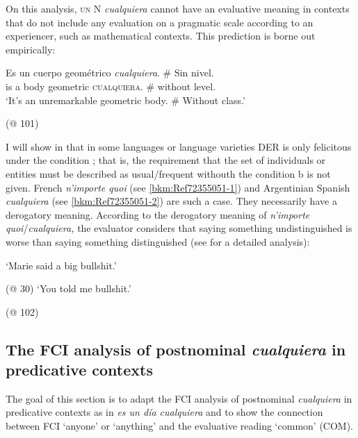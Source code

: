 {On this analysis, \textsc{un} N \textit{cualquiera} cannot have an evaluative meaning in contexts that do not include any evaluation on a pragmatic scale according to an experiencer, such as mathematical contexts. This prediction is borne out empirically:

\ea \label{ex:key:167} %
  \gll Es un cuerpo geométrico \textit{cualquiera}. \# Sin nivel.\\
is a body geometric \textsc{cualquiera}. \# without level.\\
  \glt  ‘It’s an unremarkable geometric body. \# Without class.’

  (@ 101)
\z

I will show in  that in some languages or language varieties DER is only felicitous under the condition ; that is, the requirement that the set of individuals or entities must be described as usual/frequent withouth the condition b is not given. French \textit{n’importe quoi} (see \ref{bkm:Ref72355051-1}) and Argentinian Spanish \textit{cualquiera} (see \ref{bkm:Ref72355051-2}) are such a case. They necessarily have a derogatory meaning. According to the derogatory meaning of \textit{n’importe quoi}/\textit{cualquiera,} the evaluator considers that saying something undistinguished is worse than saying something distinguished (see  for a detailed analysis):


\ea \label{bkm:Ref72355051} %
    \glt ‘Marie said a big bullshit.’

      (@ 30)
    \glt ‘You told me bullshit.’

    (@ 102)
\z
\z

\subsection{{The} {FCI} {analysis} {of} {postnominal} {\textit{cualquiera}} {in} {predicative} {contexts}} \label{sec:3.3.3}

The goal of this section is to adapt the FCI analysis of postnominal \textit{cualquiera} in predicative contexts as in \textit{es un día cualquiera} and to show the connection between FCI ‘anyone’ or ‘anything’ and the evaluative reading ‘common’ (COM).

}
